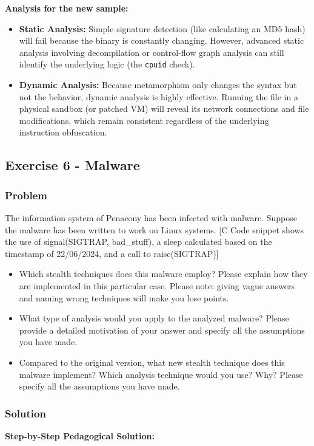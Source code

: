 \documentclass{article}
\begin{document}
\textbf{Analysis for the new sample:}
\begin{itemize}
    \item \textbf{Static Analysis:} Simple signature detection (like calculating an MD5 hash) will fail because the binary is constantly changing. However, advanced static analysis involving decompilation or control-flow graph analysis can still identify the underlying logic (the \texttt{cpuid} check).
    \item \textbf{Dynamic Analysis:} Because metamorphism only changes the syntax but not the behavior, dynamic analysis is highly effective. Running the file in a physical sandbox (or patched VM) will reveal its network connections and file modifications, which remain consistent regardless of the underlying instruction obfuscation.
\end{itemize}

\subsection{Exercise 6 - Malware}
\subsubsection*{Problem}
The information system of Penacony has been infected with malware. Suppose the malware has been written to work on Linux systems.
[C Code snippet shows the use of signal(SIGTRAP, bad\_stuff), a sleep calculated based on the timestamp of 22/06/2024, and a call to raise(SIGTRAP)]

\begin{itemize}
    \item[\textbf{1.}] [3 points] Which stealth techniques does this malware employ? Please explain how they are implemented in this particular case. Please note: giving vague answers and naming wrong techniques will make you lose points.
    \item[\textbf{2.}] [2 points] What type of analysis would you apply to the analyzed malware? Please provide a detailed motivation of your answer and specify all the assumptions you have made.
    \item[\textbf{3.}] [1 points] Compared to the original version, what new stealth technique does this malware implement? Which analysis technique would you use? Why? Please specify all the assumptions you have made.
\end{itemize}

\subsubsection*{Solution}
\textbf{Step-by-Step Pedagogical Solution:}
\end{document}
